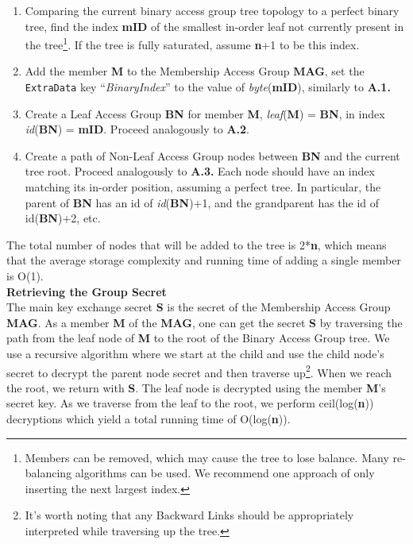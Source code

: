 \documentclass[oneside, 12pt]{article}
\newcommand{\fn}[1]{\footnote{\hangpara{1.4em}{1} #1}}
\begin{document}
\begin{enumerate}
  \item Comparing the current binary access group tree topology to a perfect binary tree, find the index \textbf{mID} of the smallest in-order leaf not currently present in the tree\fn{Members can be removed, which may cause the tree to lose balance. Many re-balancing algorithms can be used. We recommend one approach of only inserting the next largest index.}. If the tree is fully saturated, assume \textbf{n}+1 to be this index.
  \item Add the member \textbf{M} to the Membership Access Group \textbf{MAG}, set the \texttt{ExtraData} key “\textit{BinaryIndex}” to the value of \textit{byte}(\textbf{mID}), similarly to \textbf{A.1.}
  \item Create a Leaf Access Group \textbf{BN} for member \textbf{M}, \textit{leaf}(\textbf{M}) = \textbf{BN}, in index \textit{id}(\textbf{BN}) = \textbf{mID}. Proceed analogously to \textbf{A.2}.
  \item Create a path of Non-Leaf Access Group nodes between \textbf{BN} and the current tree root. Proceed analogously to \textbf{A.3.} Each node should have an index matching its in-order position, assuming a perfect tree. In particular, the parent of \textbf{BN} has an id of \textit{id}(\textbf{BN})+1, and the grandparent has the id of id(\textbf{BN})+2, etc.
\end{enumerate}

\noindent The total number of nodes that will be added to the tree is 2*\textbf{n}, which means that the average storage complexity and running time of adding a single member is O(1).\\

\noindent\textbf{Retrieving the Group Secret}\\
\noindent The main key exchange secret \textbf{S} is the secret of the Membership Access Group \textbf{MAG}. As a member \textbf{M} of the \textbf{MAG}, one can get the secret \textbf{S} by traversing the path from the leaf node of \textbf{M} to the root of the Binary Access Group tree. We use a recursive algorithm where we start at the child and use the child node’s secret to decrypt the parent node secret and then traverse up\fn{It’s worth noting that any Backward Links should be appropriately interpreted while traversing up the tree.}. When we reach the root, we return with \textbf{S}. The leaf node is decrypted using the member \textbf{M}’s secret key. As we traverse from the leaf to the root, we perform ceil(log(\textbf{n})) decryptions which yield a total running time of O(log(\textbf{n})).\\
\end{document}
